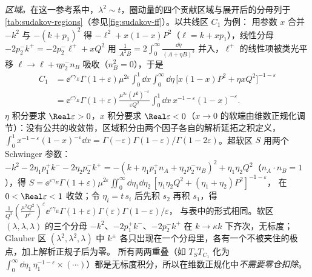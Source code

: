 \begin{example}
\emph{区域。}在这一参考系中，$\lambda^2\sim t$，圈动量的四个贡献区域与展开后的分母列于\cref{tab:sudakov-regions}（参见\cref{fig:sudakov-ff}）。以共线区 $C_1$ 为例：
用参数 $x$ 合并 $-k^2$ 与 $-(k+p_1)^2$ 得 $-\ell^2+x(1-x)P^2$（$\ell=k+xp_1$），线性分母 $-2p_2^-k^+=-2p_2^-\ell^++xQ^2$ 用
$\frac{1}{A^2B}=2\int_0^\infty\frac{\dd\eta}{(A+\eta B)^3}$ 并入，$\ell^+$ 的线性项被类光平移 $\ell\to\ell+\eta p_2^-n_B$ 吸收（$n_B^2=0$），于是
\[
\begin{aligned}
C_1&=\ee^{\varepsilon\gamma_E}\Gamma(1+\varepsilon)\mu^{2\varepsilon}\!\int_0^1\!\dd x\!\int_0^\infty\!\dd\eta\,\big[x(1-x)P^2+\eta xQ^2\big]^{-1-\varepsilon}\\
&=\ee^{\varepsilon\gamma_E}\Gamma(1+\varepsilon)\frac{\mu^{2\varepsilon}(P^2)^{-\varepsilon}}{\varepsilon Q^2}\int_0^1\!\dd x\,x^{-1-\varepsilon}(1-x)^{-\varepsilon}.
\end{aligned}
\]
$\eta$ 积分要求 $\Real\varepsilon>0$，$x$ 积分要求 $\Real\varepsilon<0$（$x\to0$ 的软端由维数正规化调节）：没有公共的收敛带，区域积分由两个因子各自的解析延拓之积定义，
$\int_0^1x^{-1-\varepsilon}(1-x)^{-\varepsilon}\dd x=\Gamma(-\varepsilon)\Gamma(1-\varepsilon)/\Gamma(1-2\varepsilon)$。超软区 $S$ 用两个 Schwinger 参数：
$-k^2-2\eta_1p_1^+k^--2\eta_2p_2^-k^+=-(k+\eta_1p_1^+n_A+\eta_2p_2^-n_B)^2+\eta_1\eta_2Q^2$（$n_A\cdot n_B=1$），得
$S=\ee^{\varepsilon\gamma_E}\Gamma(1+\varepsilon)\mu^{2\varepsilon}\iint_0^\infty\dd\eta_1\dd\eta_2\,[\eta_1\eta_2Q^2+(\eta_1+\eta_2)P^2]^{-1-\varepsilon}$，
在 $0<\Real\varepsilon<1$ 收敛；令 $\eta_i=t\,s_i$ 后先积 $s_2$ 再积 $s_1$，得 $\frac{1}{Q^2}(\frac{\mu^2Q^2}{P^4})^\varepsilon\ee^{\varepsilon\gamma_E}\Gamma(1+\varepsilon)\Gamma(\varepsilon)\Gamma(1-\varepsilon)/\varepsilon$，
与表中的形式相同。软区 $(\lambda,\lambda,\lambda)$ 的三个分母 $-k^2$、$-2p_1^+k^-$、$-2p_2^-k^+$ 在 $k\to\kappa k$ 下齐次，无标度；Glauber 区 $(\lambda^2,\lambda^2,\lambda)$ 中
$k^\pm$ 各只出现在一个分母里，各有一个不被夹住的极点，加上解析正规子后为零。
所有两两重叠（如 $T_ST_{C_1}$ 化为 $\int_0^\infty\dd\eta_1\,\eta_1^{-1-\varepsilon}\times(\cdots)$）都是无标度积分，所以在维数正规化中\emph{不需要零仓扣除}。


\end{example}
